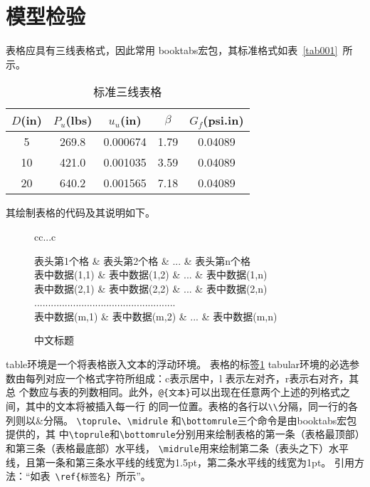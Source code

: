 \documentclass[withoutpreface,bwprint]{cumcmthesis} %
\begin{document}
\section{模型检验}
表格应具有三线表格式，因此常用 booktabs宏包，其标准格式如表~\ref{tab001}~所示。
\begin{table}[!htbp]
\caption{标准三线表格}\label{tab001} \centering
\begin{tabular}{ccccc}
\toprule[1.5pt]
\label{my_table2}
$D$(in) & $P_u$(lbs) & $u_u$(in) & $\beta$ & $G_f$(psi.in)\\
\midrule[1pt]
 5 & 269.8 & 0.000674 & 1.79 & 0.04089\\
10 & 421.0 & 0.001035 & 3.59 & 0.04089\\
20 & 640.2 & 0.001565 & 7.18 & 0.04089\\
\bottomrule[1.5pt]
\end{tabular}
\end{table}

其绘制表格的代码及其说明如下。
\begin{figure}
\begin{tcode}
\begin{table}[!htbp]
\caption[标签名]{中文标题}
\begin{tabular}{cc...c}


\toprule[1.5pt]
表头第1个格   & 表头第2个格   & ... & 表头第n个格  \\
\midrule[1pt]
表中数据(1,1) & 表中数据(1,2) & ... & 表中数据(1,n)\\
表中数据(2,1) & 表中数据(2,2) & ... & 表中数据(2,n)\\
...................................................\\
表中数据(m,1) & 表中数据(m,2) & ... & 表中数据(m,n)\\
\bottomrule[1.5pt]
\end{tabular}
\end{table}
\end{tcode}
\end{figure}

\bigskip
table环境是一个将表格嵌入文本的浮动环境。
表格的标签\ref{my_table2}
tabular环境的必选参数由每列对应一个格式字符所组成：c表示居中，l 表示左对齐，r表示右对齐，其总
个数应与表的列数相同。此外，\verb|@{文本}|可以出现在任意两个上述的列格式之间，其中的文本将被插入每一行
的同一位置。表格的各行以\verb|\\|分隔，同一行的各列则以\&分隔。
\verb|\toprule|、\verb|\midrule| 和\verb|\bottomrule|三个命令是由booktabs宏包提供的，其
中\verb|\toprule|和\verb|\bottomrule|分别用来绘制表格的第一条（表格最顶部）和第三条（表格最底部）水平线，
\verb|\midrule|用来绘制第二条（表头之下）水平线，且第一条和第三条水平线的线宽为1.5pt，第二条水平线的线宽为1pt。
引用方法：“如表~\verb|\ref{标签名}|~所示”。
\end{document}
